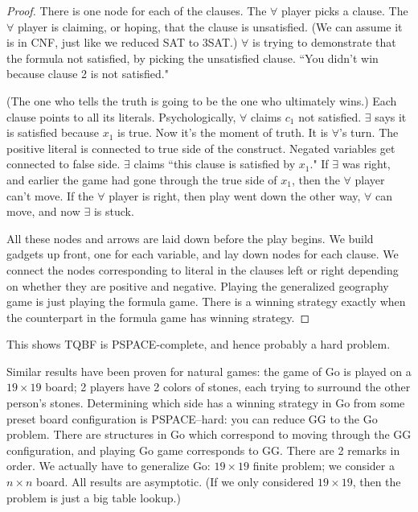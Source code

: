 \begin{proof}
There is one node for each of the clauses. The $\forall$ player picks a clause. The $\forall$ player is claiming, or hoping, that the clause is unsatisfied. (We can assume it is in CNF, just like we reduced SAT to 3SAT.) %
$\forall$ is trying to demonstrate that the formula not satisfied, by picking the unsatisfied clause. ``You didn't win because clause 2 is not satisfied."

(The one who tells the truth is going to be the one who ultimately wins.) 
Each clause points to all its literals. Psychologically, $\forall$ claims $c_1$ not satisfied. $\exists$ says it is satisfied because $x_1$ is true.  Now it's the moment of truth. It is $\forall$'s turn. The positive literal is connected to true side of the construct. Negated variables get connected to false side. $\exists$ claims ``this clause is satisfied by $x_1$." If $\exists $ was right, and earlier the game had gone through the true side of $x_1$, then the $\forall$ player can't move. If the $\forall $ player is right, then play went down the other way, $\forall$ can move, and now $\exists$ is stuck. 

All these nodes and arrows are laid down before the play begins. We build gadgets up front, one for each variable, and lay down nodes for each clause. We connect the nodes corresponding to literal in the clauses left or right depending on whether they are positive and negative. Playing the generalized geography game is just playing the formula game. There is a winning strategy exactly when the counterpart in the formula game has winning strategy. 
\end{proof}
This shows TQBF is PSPACE-complete, and hence probably a hard problem.

Similar results have been proven for natural games: the game of Go is played on a $19\times 19$ board; 2 players have 2 colors of stones, each trying to surround the other person's stones. Determining which side has a winning strategy in Go from some preset board configuration is PSPACE--hard: you can reduce GG to the Go problem. There are structures in Go which correspond to moving through the GG configuration, and playing Go game corresponds to GG. %
There are 2 remarks in order. We actually have to generalize Go: $19\times 19$ finite problem; we consider a $n\times n$ board. All results are asymptotic. (If we only considered $19\times 19$, then the problem is just a big table lookup.)


